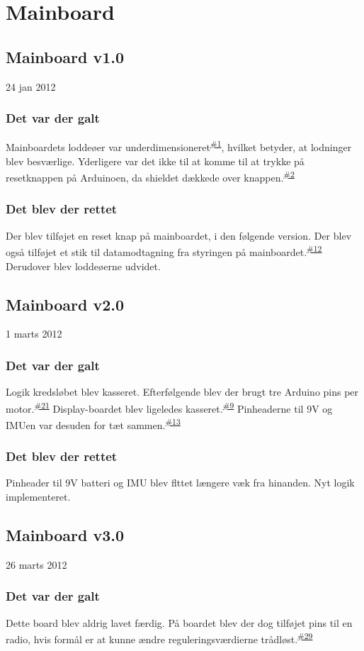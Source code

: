 \documentclass[a4paper,oneside,article,danish,table]{memoir}
\newcommand{\boarddate}[1]{\textcolor{blue!80!black}{#1}}
\newcommand{\issue}[1]{\textsuperscript{\textcolor{blue!80!black}{\href{https://github.com/neic/Swagway/issues/#1}{\##1}}}}
\begin{document}
\section{Mainboard}

\subsection{Mainboard v1.0}
\boarddate{24 jan 2012}
\subsubsection{Det var der galt}
Mainboardets loddeøer var underdimensioneret\issue{1}, hvilket betyder, at lodninger blev besværlige. Yderligere var det ikke til at komme til at trykke på resetknappen på Arduinoen, da shieldet dækkede over knappen.\issue{2} 
\subsubsection{Det blev der rettet}
Der blev tilføjet en reset knap på mainboardet, i den følgende version. Der blev også tilføjet et stik til datamodtagning fra styringen på mainboardet.\issue{12}
Derudover blev loddeøerne udvidet.
\subsection{Mainboard v2.0}
\boarddate{1 marts 2012}
\subsubsection{Det var der galt}
Logik kredsløbet blev kasseret. Efterfølgende blev der brugt tre Arduino pins per motor.\issue{21} Display-boardet blev ligeledes kasseret.\issue{9} Pinheaderne til 9V og IMUen var desuden for tæt sammen.\issue{13}
\subsubsection{Det blev der rettet}
Pinheader til 9V batteri og IMU blev flttet længere væk fra hinanden. Nyt logik implementeret.
\subsection{Mainboard v3.0}
\boarddate{26 marts 2012} 
\subsubsection{Det var der galt}
Dette board blev aldrig lavet færdig.
På boardet blev der dog tilføjet pins til en radio, hvis formål er at kunne ændre reguleringsværdierne trådløst.\issue{29}
\end{document}
